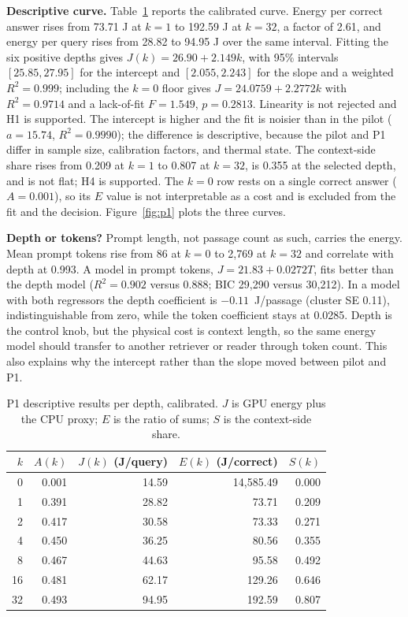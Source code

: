 \documentclass[a4paper,fleqn]{cas-sc}
\begin{document}
\textbf{Descriptive curve.} Table~\ref{tab:p1desc} reports the calibrated curve. Energy per correct answer rises from 73.71 J at $k=1$ to 192.59 J at $k=32$, a factor of 2.61, and energy per query rises from 28.82 to 94.95 J over the same interval. Fitting the six positive depths gives $J(k)=26.90+2.149k$, with 95\% intervals $[25.85,27.95]$ for the intercept and $[2.055,2.243]$ for the slope and a weighted $R^{2}=0.999$; including the $k=0$ floor gives $J=24.0759+2.2772k$ with $R^{2}=0.9714$ and a lack-of-fit $F=1.549$, $p=0.2813$. Linearity is not rejected and H1 is supported. The intercept is higher and the fit is noisier than in the pilot ($a=15.74$, $R^{2}=0.9990$); the difference is descriptive, because the pilot and P1 differ in sample size, calibration factors, and thermal state. The context-side share rises from 0.209 at $k=1$ to 0.807 at $k=32$, is 0.355 at the selected depth, and is not flat; H4 is supported. The $k=0$ row rests on a single correct answer ($A=0.001$), so its $E$ value is not interpretable as a cost and is excluded from the fit and the decision. Figure~\ref{fig:p1} plots the three curves.

\textbf{Depth or tokens?} Prompt length, not passage count as such, carries the energy. Mean prompt tokens rise from 86 at $k=0$ to 2{,}769 at $k=32$ and correlate with depth at 0.993. A model in prompt tokens, $J=21.83+0.0272T$, fits better than the depth model ($R^{2}=0.902$ versus 0.888; BIC 29{,}290 versus 30{,}212). In a model with both regressors the depth coefficient is $-0.11$~J/passage (cluster SE 0.11), indistinguishable from zero, while the token coefficient stays at 0.0285. Depth is the control knob, but the physical cost is context length, so the same energy model should transfer to another retriever or reader through token count. This also explains why the intercept rather than the slope moved between pilot and P1.

\begin{table}[pos=htbp]
  \centering
  \caption{P1 descriptive results per depth, calibrated. $J$ is GPU energy plus the CPU proxy; $E$ is the ratio of sums; $S$ is the context-side share.}
  \label{tab:p1desc}
  \footnotesize
  \setlength{\tabcolsep}{5pt}
  \begin{tabular}{@{}rrrrr@{}}
    \toprule
    \textbf{$k$} & \textbf{$A(k)$} & \textbf{$J(k)$ (J/query)} & \textbf{$E(k)$ (J/correct)} & \textbf{$S(k)$} \\
    \midrule
    0  & 0.001 & 14.59 & 14{,}585.49 & 0.000 \\
    1  & 0.391 & 28.82 & 73.71  & 0.209 \\
    2  & 0.417 & 30.58 & 73.33  & 0.271 \\
    4  & 0.450 & 36.25 & 80.56  & 0.355 \\
    8  & 0.467 & 44.63 & 95.58  & 0.492 \\
    16 & 0.481 & 62.17 & 129.26 & 0.646 \\
    32 & 0.493 & 94.95 & 192.59 & 0.807 \\
    \bottomrule
  \end{tabular}
\end{table}
\end{document}

